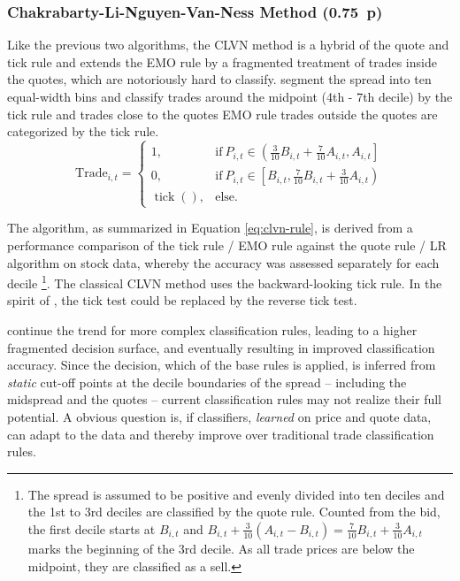 \subsubsection{Chakrabarty-Li-Nguyen-Van-Ness
  Method (0.75~p)}\label{sec:chakarabarty-li-nguyen-van-ness-method}

Like the previous two algorithms, the CLVN method \autocite[][3809]{chakrabartyTradeClassificationAlgorithms2012} is a hybrid of the quote and tick rule and extends the EMO rule by a fragmented treatment of trades inside the quotes, which are notoriously hard to classify. \textcite[][3809]{chakrabartyTradeClassificationAlgorithms2012} segment the spread into ten equal-width bins and classify trades around the midpoint (4th - 7th decile) by the tick rule and trades close to the quotes EMO rule trades outside the quotes are categorized by the tick rule.
\begin{equation}
  \text{Trade}_{i,t}=
  \begin{cases}
    1,                     & \text{if}\ P_{i, t} \in \left(\frac{3}{10} B_{i,t} + \frac{7}{10} A_{i,t}, A_{i, t}\right] \\
    0,                     & \text{if}\ P_{i, t} \in \left[ B_{i,t}, \frac{7}{10} B_{i,t} + \frac{3}{10} A_{i,t}\right) \\
    \operatorname{tick}(), & \text{else}.                                                                                
  \end{cases}
  \label{eq:clvn-rule}
\end{equation}

The algorithm, as summarized in Equation \ref{eq:clvn-rule}, is derived from a performance comparison of the tick rule / EMO rule against the quote rule / LR algorithm on stock data, whereby the accuracy was assessed separately for each decile \footnote{The spread is assumed to be positive and evenly divided into ten deciles and the 1st to 3rd deciles are classified by the quote rule. Counted from the bid, the first decile starts at $B_{i,t}$ and  $B_{i,t} + \frac{3}{10}(A_{i,t} - B_{i,t}) = \frac{7}{10} B_{i,t} + \frac{3}{10} A_{i,t}$ marks the beginning of the 3rd decile. As all trade prices are below the midpoint, they are classified as a sell.}. The classical CLVN method uses the backward-looking tick rule. In the spirit of \textcite[][735]{leeInferringTradeDirection1991}, the tick test could be replaced by the reverse tick test.


\textcite[][3811]{chakrabartyTradeClassificationAlgorithms2007} continue the trend for more complex classification rules, leading to a higher fragmented decision surface, and eventually resulting in improved classification accuracy. Since the decision, which of the base rules is applied, is inferred from \emph{static} cut-off points at the decile boundaries of the spread -- including the midspread and the quotes -- current classification rules may not realize their full potential. A obvious question is, if classifiers, \emph{learned} on price and quote data, can adapt to the data and thereby improve over traditional trade classification rules.

